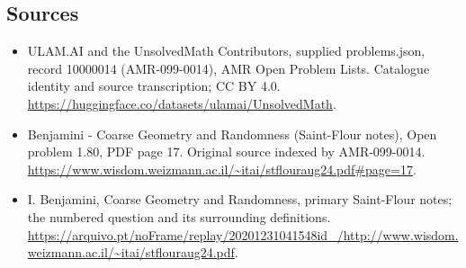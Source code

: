 \documentclass[11pt,a4paper]{article}
\begin{document}
\subsection{Sources}
\begin{itemize}
\item[S1] ULAM.AI and the UnsolvedMath Contributors, supplied problems.json, record 10000014 (AMR-099-0014), AMR Open Problem Lists. Catalogue identity and source transcription; CC BY 4.0.
\url{https://huggingface.co/datasets/ulamai/UnsolvedMath}.
\item[S2] Benjamini - Coarse Geometry and Randomness (Saint-Flour notes), Open problem 1.80, PDF page 17. Original source indexed by AMR-099-0014.
\url{https://www.wisdom.weizmann.ac.il/~itai/stflouraug24.pdf#page=17}.
\item[S3] I. Benjamini, Coarse Geometry and Randomness, primary Saint-Flour notes; the numbered question and its surrounding definitions.
\url{https://arquivo.pt/noFrame/replay/20201231041548id_/http://www.wisdom.weizmann.ac.il/~itai/stflouraug24.pdf}.
\end{itemize}
\end{document}

